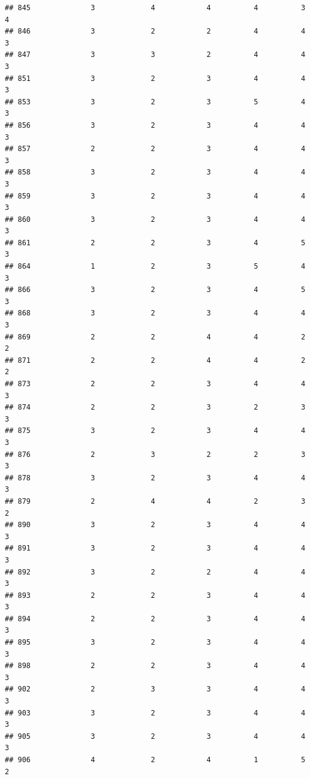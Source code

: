 \documentclass[
]{article}
\begin{document}
\begin{verbatim}
## 845              3             4            4          4          3        4
## 846              3             2            2          4          4        3
## 847              3             3            2          4          4        3
## 851              3             2            3          4          4        3
## 853              3             2            3          5          4        3
## 856              3             2            3          4          4        3
## 857              2             2            3          4          4        3
## 858              3             2            3          4          4        3
## 859              3             2            3          4          4        3
## 860              3             2            3          4          4        3
## 861              2             2            3          4          5        3
## 864              1             2            3          5          4        3
## 866              3             2            3          4          5        3
## 868              3             2            3          4          4        3
## 869              2             2            4          4          2        2
## 871              2             2            4          4          2        2
## 873              2             2            3          4          4        3
## 874              2             2            3          2          3        3
## 875              3             2            3          4          4        3
## 876              2             3            2          2          3        3
## 878              3             2            3          4          4        3
## 879              2             4            4          2          3        2
## 890              3             2            3          4          4        3
## 891              3             2            3          4          4        3
## 892              3             2            2          4          4        3
## 893              2             2            3          4          4        3
## 894              2             2            3          4          4        3
## 895              3             2            3          4          4        3
## 898              2             2            3          4          4        3
## 902              2             3            3          4          4        3
## 903              3             2            3          4          4        3
## 905              3             2            3          4          4        3
## 906              4             2            4          1          5        2

\end{verbatim}
\end{document}
